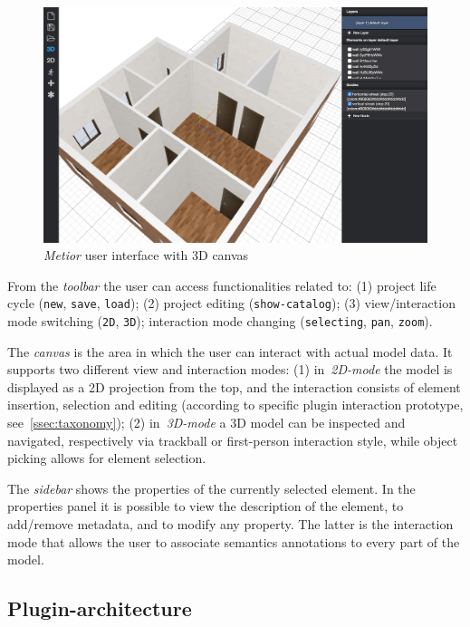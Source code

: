 \begin{figure}[htbp] %
   \centering
   \includegraphics[width=1\linewidth]{images/3d}
   \caption{\emph{Metior} user interface with 3D canvas}
   \label{fig:ui2}
\end{figure}

From the \emph{toolbar} the user can access functionalities related to: (1) project life cycle ({\tt new}, {\tt save}, {\tt load}); (2) project editing  ({\tt  show-catalog}); (3) view/interaction mode switching ({\tt 2D}, {\tt  3D}); interaction mode changing ({\tt  selecting}, {\tt pan}, {\tt zoom}).


The \emph{canvas} is the area in which the user can interact with actual model data. It supports two different view and interaction modes: (1) in~\emph{2D-mode} the model is displayed as a 2D projection from the top, and the interaction consists of element insertion, selection and editing (according to specific plugin interaction prototype, see~\ref{ssec:taxonomy}); (2) in~\emph{3D-mode} a 3D model can be inspected and navigated, respectively via trackball or first-person interaction style, while object picking allows for element selection.

The \emph{sidebar} shows the properties of the currently selected element.
In the properties panel it is possible to view the description of the element, to add/remove metadata, and to modify any property. The latter is the interaction mode that allows the user to associate semantics annotations to every part of the model.

\subsection{Plugin-architecture}

